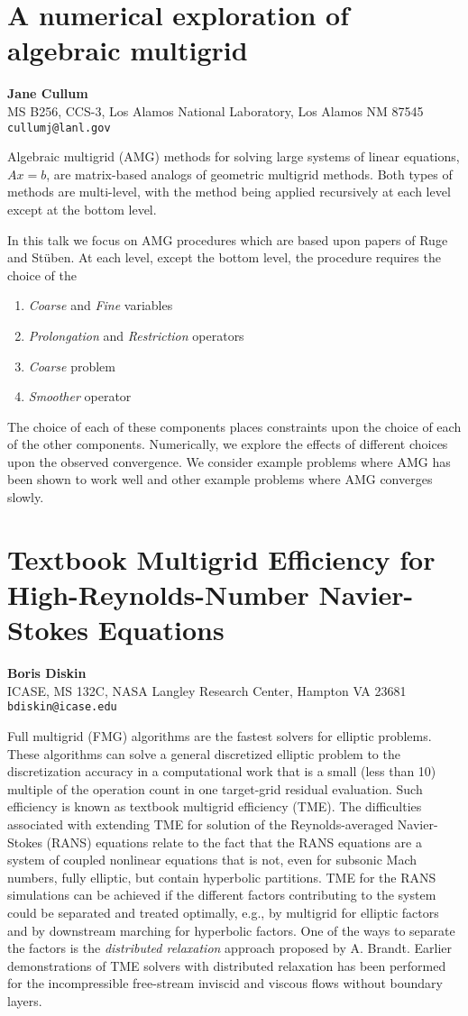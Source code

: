 \documentclass[11pt]{article}
\newcommand{\nextab}[4]{
	\section{#2}
	{\bf #1} \\ \nopagebreak
	{#3} \\ \nopagebreak
	{\tt #4} \nopagebreak
	}
\begin{document}

\nextab
{Jane Cullum}
{A numerical exploration of algebraic multigrid}
{MS B256, CCS-3, Los Alamos National Laboratory, Los Alamos NM 87545}
{cullumj@lanl.gov}


Algebraic multigrid (AMG) methods for
solving large systems of linear equations, $Ax=b$,
are  matrix-based analogs of geometric
multigrid methods.
Both types of methods are multi-level,
with the method being applied recursively
at each level except at the bottom level.


In this talk we
focus on AMG procedures which are
based upon papers of Ruge and St\"uben.
At each level, except the bottom level,
the procedure requires the choice of the
\begin{enumerate}
\item {\em Coarse} and {\em Fine} variables
\item {\em Prolongation} and  {\em Restriction} operators
\item {\em Coarse} problem
\item {\em Smoother} operator
\end{enumerate}

The choice of each of these components
places constraints upon the choice of each of
the other components.
Numerically, we explore the effects of
different choices upon the observed convergence.
We consider example problems where AMG
has been shown to work well and other example
problems where  AMG converges
slowly.




\nextab
{Boris Diskin}
{Textbook Multigrid Efficiency for High-Reynolds-Number Navier-Stokes Equations}
{ICASE, MS 132C, NASA Langley Research Center, Hampton VA 23681}
{bdiskin@icase.edu}


Full multigrid (FMG) algorithms are the fastest solvers for elliptic problems.
These algorithms can solve a general discretized elliptic problem
to the discretization accuracy in a computational work  that is a small
(less than 10) multiple of the operation count in one target-grid residual
evaluation. Such efficiency is known as textbook multigrid efficiency
(TME). The difficulties associated with extending
TME for solution of the Reynolds-averaged
Navier-Stokes (RANS) equations relate to the fact that the
RANS equations are a system of coupled nonlinear equations
that is not, even for subsonic Mach numbers, fully elliptic, but
contain hyperbolic partitions. TME for the RANS simulations
can be achieved if the different factors contributing to
the system could be separated and treated
optimally, e.g., by multigrid for elliptic factors
and by downstream marching for hyperbolic factors.
One of the ways to separate the factors is the
{\em distributed relaxation} approach proposed by A. Brandt.
Earlier demonstrations of TME solvers with
distributed relaxation has been performed for
the incompressible free-stream inviscid and viscous
flows without boundary layers.
\end{document}
